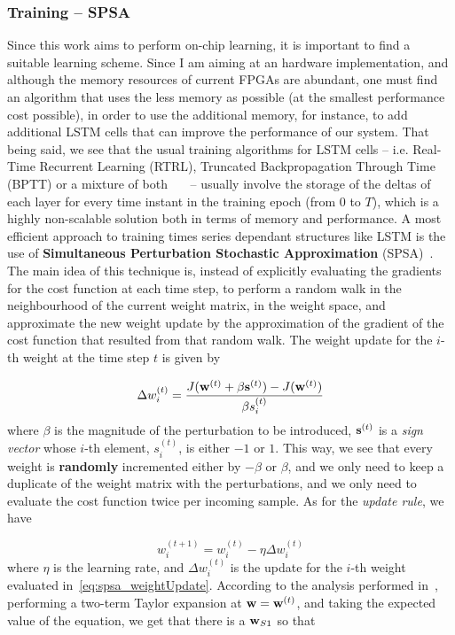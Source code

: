 \subsubsection{Training -- SPSA}\label{sec:training_lstm}
Since this work aims to perform on-chip learning, it is important to find a suitable learning scheme. Since I am aiming at an hardware implementation, and although the memory resources of current FPGAs are abundant, one must find an algorithm that uses the less memory as possible (at the smallest performance cost possible), in order to use the additional memory, for instance, to add additional LSTM cells that can improve the performance of our system. 
That being said, we see that the usual training algorithms for LSTM cells -- i.e. Real-Time Recurrent Learning (RTRL), Truncated Backpropagation Through Time (BPTT) or a mixture of both~\cite{Graves05}~\cite{Hoch97}~\cite{Greff15} -- usually involve the storage of the deltas of each layer for every time instant in the training epoch (from $0$ to $T$), which is a highly non-scalable solution both in terms of memory and performance. A most efficient approach to training times series dependant structures like LSTM is the use of \textbf{Simultaneous Perturbation Stochastic Approximation} (SPSA)~\cite{Spall98}.  The main idea of this technique is, instead of explicitly evaluating the gradients for the cost function at each time step, to perform a random walk in the neighbourhood of the current weight matrix, in the weight space, and approximate the new weight update by the approximation of the gradient of the cost function that resulted from that random walk. The weight update for the $i$-th weight at the time step $t$ is given by 

\begin{equation}\label{eq:spsa_weightUpdate}
    \Delta w_i^{(t)} = \frac{J(\mathbf{w}^{(t)} + \beta \mathbf{s}^{(t)}) - J(\mathbf{w}^{(t)})}{\beta s_i^{(t)}}
\end{equation}
where $\beta$ is the magnitude of the perturbation to be introduced, $\mathbf{s}^{(t)}$ is a \textit{sign vector} whose $i$-th element, $s_i^{(t)}$, is either $-1$ or $1$. This way, we see that every weight is \textbf{randomly} incremented either by $-\beta$ or $\beta$, and we only need to keep a duplicate of the weight matrix with the perturbations, and we only need to evaluate the cost function twice per incoming sample. As for the \textit{update rule}, we have 

\begin{equation}\label{eq:spsa_updateRule}
    w_i^{(t+1)} = w_i^{(t)} - \eta \Delta w_i^{(t)}
\end{equation}
where $\eta$ is the learning rate, and $\Delta w_i^{(t)}$ is the update for the $i$-th weight evaluated in~\ref{eq:spsa_weightUpdate}.
According to the analysis performed in~\cite{Maeda05}, performing a two-term Taylor expansion at $\mathbf{w} = \mathbf{w}^{(t)}$, and taking the expected value of the equation, we get that there is a $\mathbf{w}_{S1}$ so that

